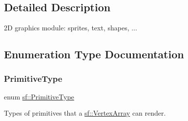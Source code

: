 \subsection{Detailed Description}
2D graphics module\+: sprites, text, shapes, ... \begin{DoxyVerb}\end{DoxyVerb}
 

\subsection{Enumeration Type Documentation}
\mbox{\label{group__graphics_ga5ee56ac1339984909610713096283b1b}} 
\subsubsection{\texorpdfstring{PrimitiveType}{PrimitiveType}}
{\footnotesize\ttfamily enum \mbox{\hyperlink{group__graphics_ga5ee56ac1339984909610713096283b1b}{sf\+::\+Primitive\+Type}}}



Types of primitives that a \mbox{\hyperlink{classsf_1_1_vertex_array}{sf\+::\+Vertex\+Array}} can render. 

